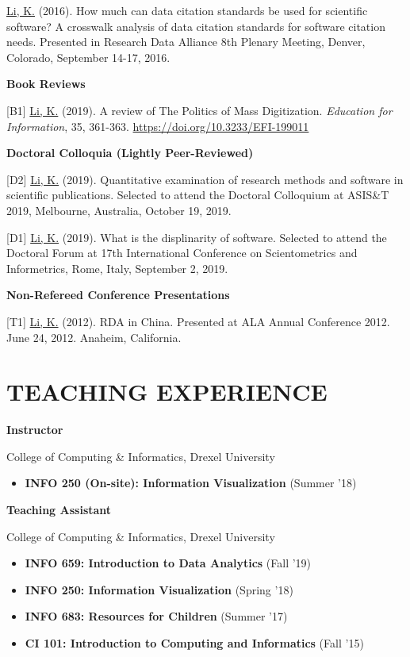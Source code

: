 \documentclass[margin, 10pt]{res} %
\begin{document}
\begin{resume}
[P1] \underline{Li, K.} (2016). How much can data citation standards be used for scientific software? A crosswalk analysis of data citation standards for software citation needs. Presented in Research Data Alliance 8th Plenary Meeting, Denver, Colorado, September 14-17, 2016.

\textbf{Book Reviews}

[B1] \underline{Li, K.} (2019). A review of The Politics of Mass Digitization. \textit{Education for Information}, 35, 361-363. \href{https://doi.org/10.3233/EFI-199011}{https://doi.org/10.3233/EFI-199011}

\textbf{Doctoral Colloquia (Lightly Peer-Reviewed)}

[D2] \underline{Li, K.} (2019). Quantitative examination of research methods and software in scientific publications. Selected to attend the Doctoral Colloquium at ASIS\&T 2019, Melbourne, Australia, October 19, 2019.

[D1] \underline{Li, K.} (2019). What is the displinarity of software. Selected to attend the Doctoral Forum at 17th International Conference on Scientometrics and Informetrics, Rome, Italy, September 2, 2019.

\textbf{Non-Refereed Conference Presentations}

[T1] \underline{Li, K.} (2012). RDA in China. Presented at ALA Annual Conference 2012. June 24, 2012. Anaheim, California.

\section{TEACHING EXPERIENCE}

\textbf{Instructor}

College of Computing \& Informatics, Drexel University

\begin{itemize}
\item \textbf{INFO 250 (On-site): Information Visualization} (Summer '18)
\end{itemize}

\textbf{Teaching Assistant}

College of Computing \& Informatics, Drexel University

\begin{itemize}
\item \textbf{INFO 659: Introduction to Data Analytics} (Fall '19)
\item \textbf{INFO 250: Information Visualization} (Spring '18)
\item \textbf{INFO 683: Resources for Children} (Summer '17)
\item \textbf{CI 101: Introduction to Computing and Informatics} (Fall '15)
\end{itemize}


\end{resume}
\end{document}
